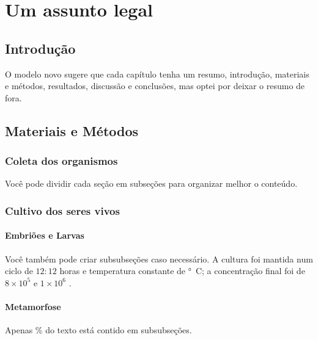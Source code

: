 \chapter{Um assunto legal}\label{cap2}

\section{Introdução}\label{cap2:intro}

O modelo novo sugere que cada capítulo tenha um resumo, introdução, materiais e métodos, resultados, discussão e conclusões, mas optei por deixar o resumo de fora.

\section{Materiais e Métodos}\label{cap2:mem}

\subsection{Coleta dos organismos}\label{cap2:mem:coleta}

Você pode dividir cada seção em subseções para organizar melhor o conteúdo.

\subsection{Cultivo dos seres vivos}\label{cap2:mem:gametas}

\subsubsection{Embriões e Larvas}

Você também pode criar subsubseções caso necessário.
A cultura foi mantida num ciclo de $12:12$ horas e temperatura constante de \unit[24]{°C}; a concentração final foi de $8\times10^5$ e $1\times10^6$ .

\subsubsection{Metamorfose}

Apenas \unit[4]{\%} do texto está contido em subsubseções.


